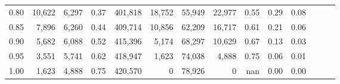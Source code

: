 \begin{tabular}{rrrrrrrrrrrrrr}
0.80 &  10,622 &  6,297 &  0.37 &  401,818 &   18,752 &  55,949 &  22,977 &  0.55 &  0.29 &      0.08 \\
0.85 &   7,896 &  6,260 &  0.44 &  409,714 &   10,856 &  62,209 &  16,717 &  0.61 &  0.21 &      0.06 \\
0.90 &   5,682 &  6,088 &  0.52 &  415,396 &    5,174 &  68,297 &  10,629 &  0.67 &  0.13 &      0.03 \\
0.95 &   3,551 &  5,741 &  0.62 &  418,947 &    1,623 &  74,038 &   4,888 &  0.75 &  0.06 &      0.01 \\
1.00 &   1,623 &  4,888 &  0.75 &  420,570 &        0 &  78,926 &       0 &   nan &  0.00 &      0.00 \\
\bottomrule
\end{tabular}
